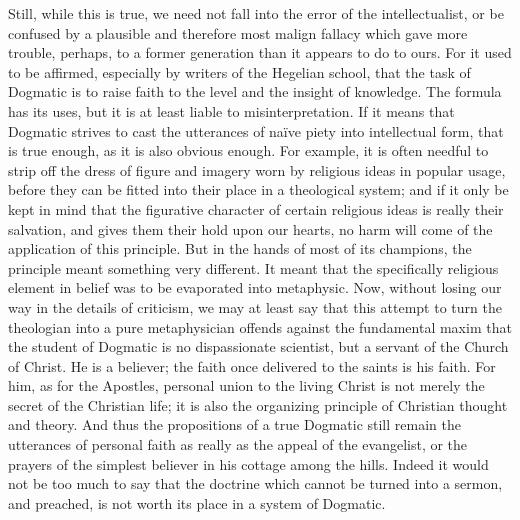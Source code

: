 \documentclass[12pt,a5paper]{article}
\begin{document}
Still, while this is true, we need not fall into the error
of the intellectualist, or be confused by a plausible and
therefore most malign fallacy which gave more trouble, perhaps,
to a former generation than it appears to do to ours.
For it used to be affirmed, especially by writers of the
Hegelian school, that the task of Dogmatic is to raise faith
to the level and the insight of knowledge. The formula
has its uses, but it is at least liable to misinterpretation.
If it means that Dogmatic strives to cast the utterances of
na\"{i}ve piety into intellectual form, that is true enough, as
it is also obvious enough. For example, it is often needful
to strip off the dress of figure and imagery worn by
religious ideas in popular usage, before they can be fitted
into their place in a theological system; and if it only be
kept in mind that the figurative character of certain
religious ideas is really their salvation, and gives them
their hold upon our hearts, no harm will come of the
application of this principle. But in the hands of most of
its champions, the principle meant something very different.
It meant that the specifically religious element in
belief was to be evaporated into metaphysic. Now,
without losing our way in the details of criticism, we may
at least say that this attempt to turn the theologian into a
pure metaphysician offends against the fundamental maxim
that the student of Dogmatic is no dispassionate scientist,
but a servant of the Church of Christ. He is a believer;
the faith once delivered to the saints is his faith. For him,
as for the Apostles, personal union to the living Christ is
not merely the secret of the Christian life; it is also the
organizing principle of Christian thought and theory. And
thus the propositions of a true Dogmatic still remain the
utterances of personal faith as really as the appeal of the
evangelist, or the prayers of the simplest believer in his
cottage among the hills. Indeed it would not be too much
to say that the doctrine which cannot be turned into a
sermon, and preached, is not worth its place in a system of
Dogmatic.
\end{document}
